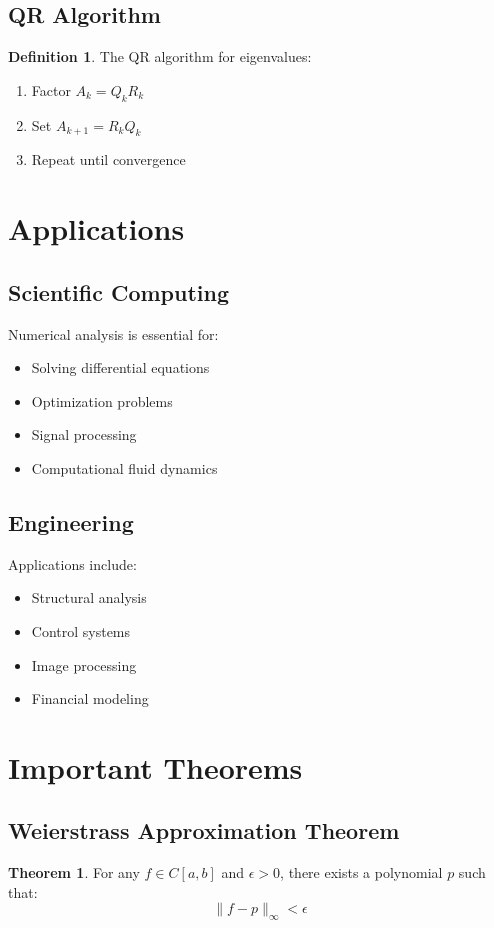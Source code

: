 \documentclass[11pt]{article}
\theoremstyle{definition}
\newtheorem{definition}{Definition}[section]
\newtheorem{theorem}{Theorem}[section]
\begin{document}
\subsection{QR Algorithm}
\begin{definition}
The QR algorithm for eigenvalues:
\begin{enumerate}
    \item Factor $A_k = Q_k R_k$
    \item Set $A_{k+1} = R_k Q_k$
    \item Repeat until convergence
\end{enumerate}
\end{definition}

\section{Applications}

\subsection{Scientific Computing}
Numerical analysis is essential for:
\begin{itemize}
    \item Solving differential equations
    \item Optimization problems
    \item Signal processing
    \item Computational fluid dynamics
\end{itemize}

\subsection{Engineering}
Applications include:
\begin{itemize}
    \item Structural analysis
    \item Control systems
    \item Image processing
    \item Financial modeling
\end{itemize}

\section{Important Theorems}

\subsection{Weierstrass Approximation Theorem}
\begin{theorem}
For any $f \in C[a,b]$ and $\epsilon > 0$, there exists a polynomial $p$ such that:
$$\|f - p\|_\infty < \epsilon$$
\end{theorem}
\end{document}
